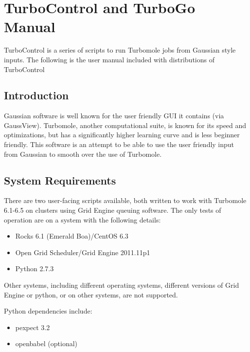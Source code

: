 \chapter{TurboControl and TurboGo Manual}\label{chap.readme}


TurboControl is a series of scripts to run Turbomole jobs from Gaussian style inputs. The following is the user manual included with distributions of TurboControl 

\section{Introduction}
Gaussian software is well known for the user friendly GUI it contains
(via GaussView). Turbomole, another computational suite, is known for
its speed and optimizations, but has a significantly higher learning
curve and is less beginner friendly. This software is an attempt to be
able to use the user friendly input from Gaussian to smooth over the use
of Turbomole.

\section{System Requirements}

There are two user-facing scripts available, both written to work with
Turbomole 6.1-6.5 on clusters using Grid Engine queuing software. The
only tests of operation are on a system with the following details:

\begin{itemize}
\itemsep1pt\parskip0pt
\item
  Rocks 6.1 (Emerald Boa)/CentOS 6.3
\item
  Open Grid Scheduler/Grid Engine 2011.11p1
\item
  Python 2.7.3
\end{itemize}

Other systems, including different operating systems, different versions
of Grid Engine or python, or on other systems, are not supported.

Python dependencies include:

\begin{itemize}
\itemsep1pt\parskip0pt
\item
  pexpect 3.2\autocite{pexpect}
\item
  openbabel\autocite{openbabel, oboyle2011} (optional)
\end{itemize}

